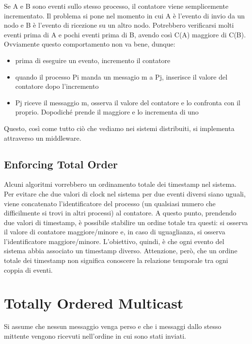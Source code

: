 Se A e B sono eventi sullo stesso processo, il contatore viene semplicemente incrementato. Il problema si pone nel momento in cui A è l'evento di invio da un nodo e B è l'evento di ricezione su un altro nodo. Potrebbero verificarsi molti eventi prima di A e pochi eventi prima di B, avendo così C(A) maggiore di C(B). Ovviamente questo comportamento non va bene, dunque:

\begin{itemize}
    \item prima di eseguire un evento, incremento il contatore
    \item quando il processo Pi manda un messagio m a Pj, inserisce il valore del contatore dopo l'incremento
    \item Pj riceve il messaggio m, osserva il valore del contatore e lo confronta con il proprio. Dopodiché prende il maggiore e lo incrementa di uno
\end{itemize}

Questo, così come tutto ciò che vediamo nei sistemi distribuiti, si implementa attraverso un middleware.

\subsection{Enforcing Total Order}

Alcuni algoritmi vorrebbero un ordinamento totale dei timestamp nel sistema. Per evitare che due valori di clock nel sistema per due eventi diversi siano uguali, viene concatenato l'identificatore del processo (un qualsiasi numero che difficilmente si trovi in altri processi) al contatore. A questo punto, prendendo due valori di timestamp, è possibile stabilire un ordine totale tra questi: si osserva il valore di contatore maggiore/minore e, in caso di uguaglianza, si osserva l'identificatore maggiore/minore. L'obiettivo, quindi, è che ogni evento del sistema abbia associato un timestamp diverso. Attenzione, però, che un ordine totale dei timestamp non significa conoscere la relazione temporale tra ogni coppia di eventi.

\section{Totally Ordered Multicast}

Si assume che nessun messaggio venga perso e che i messaggi dallo stesso mittente vengono ricevuti nell'ordine in cui sono stati inviati.

